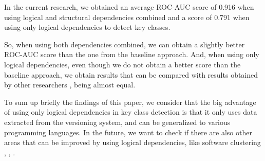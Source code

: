 \documentclass[runningheads]{comsis2}
\begin{document}
In the current research, we obtained an average ROC-AUC score of 0.916 when using logical and structural dependencies combined and a score of 0.791 when using only logical dependencies to detect key classes.

So, when using both dependencies combined, we can obtain a slightly better ROC-AUC score than the one from the baseline approach. And, when using only logical dependencies, even though we do not obtain a better score than the baseline approach, we obtain results that can be compared with results obtained by other researchers \cite{6676885}, being almost equal. 

To sum up briefly the findings of this paper, we consider that the big advantage of using only logical dependencies in key class detection is that it only uses data extracted from the versioning system, and can be generalized to various programming languages. In the future, we want to check if there are also other areas that can be improved by using logical dependencies, like software clustering \cite{SoraConti}, \cite{Shtern:2012:CMS:2332427.2332428}, \cite{SoraSem13}.






%
%

\end{document}
